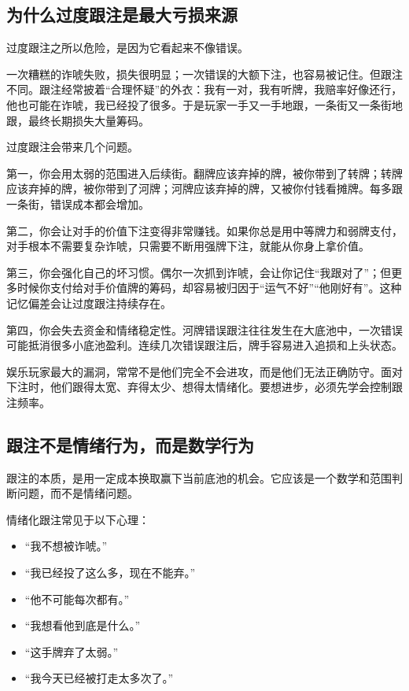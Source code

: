 \subsection{为什么过度跟注是最大亏损来源}

过度跟注之所以危险，是因为它看起来不像错误。

一次糟糕的诈唬失败，损失很明显；一次错误的大额下注，也容易被记住。但跟注不同。跟注经常披着“合理怀疑”的外衣：我有一对，我有听牌，我赔率好像还行，他也可能在诈唬，我已经投了很多。于是玩家一手又一手地跟，一条街又一条街地跟，最终长期损失大量筹码。

过度跟注会带来几个问题。

第一，你会用太弱的范围进入后续街。翻牌应该弃掉的牌，被你带到了转牌；转牌应该弃掉的牌，被你带到了河牌；河牌应该弃掉的牌，又被你付钱看摊牌。每多跟一条街，错误成本都会增加。

第二，你会让对手的价值下注变得非常赚钱。如果你总是用中等牌力和弱牌支付，对手根本不需要复杂诈唬，只需要不断用强牌下注，就能从你身上拿价值。

第三，你会强化自己的坏习惯。偶尔一次抓到诈唬，会让你记住“我跟对了”；但更多时候你支付给对手价值牌的筹码，却容易被归因于“运气不好”“他刚好有”。这种记忆偏差会让过度跟注持续存在。

第四，你会失去资金和情绪稳定性。河牌错误跟注往往发生在大底池中，一次错误可能抵消很多小底池盈利。连续几次错误跟注后，牌手容易进入追损和上头状态。

娱乐玩家最大的漏洞，常常不是他们完全不会进攻，而是他们无法正确防守。面对下注时，他们跟得太宽、弃得太少、想得太情绪化。要想进步，必须先学会控制跟注频率。

\subsection{跟注不是情绪行为，而是数学行为}

跟注的本质，是用一定成本换取赢下当前底池的机会。它应该是一个数学和范围判断问题，而不是情绪问题。

情绪化跟注常见于以下心理：

\begin{itemize}
\item “我不想被诈唬。”
\item “我已经投了这么多，现在不能弃。”
\item “他不可能每次都有。”
\item “我想看他到底是什么。”
\item “这手牌弃了太弱。”
\item “我今天已经被打走太多次了。”
\end{itemize}

